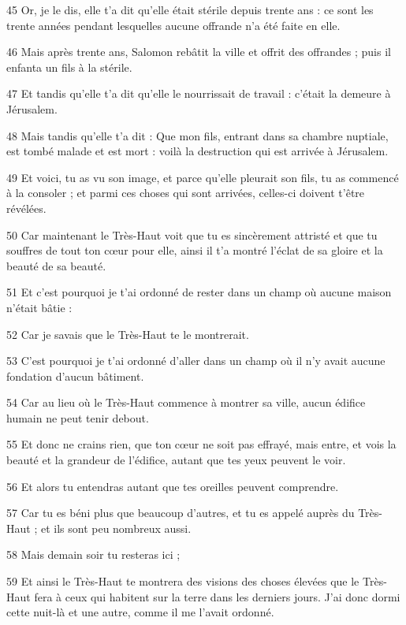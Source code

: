 \par 45 Or, je le dis, elle t'a dit qu'elle était stérile depuis trente ans : ce sont les trente années pendant lesquelles aucune offrande n'a été faite en elle.
\par 46 Mais après trente ans, Salomon rebâtit la ville et offrit des offrandes ; puis il enfanta un fils à la stérile.
\par 47 Et tandis qu'elle t'a dit qu'elle le nourrissait de travail : c'était la demeure à Jérusalem.
\par 48 Mais tandis qu'elle t'a dit : Que mon fils, entrant dans sa chambre nuptiale, est tombé malade et est mort : voilà la destruction qui est arrivée à Jérusalem.
\par 49 Et voici, tu as vu son image, et parce qu'elle pleurait son fils, tu as commencé à la consoler ; et parmi ces choses qui sont arrivées, celles-ci doivent t'être révélées.
\par 50 Car maintenant le Très-Haut voit que tu es sincèrement attristé et que tu souffres de tout ton cœur pour elle, ainsi il t'a montré l'éclat de sa gloire et la beauté de sa beauté.
\par 51 Et c'est pourquoi je t'ai ordonné de rester dans un champ où aucune maison n'était bâtie :
\par 52 Car je savais que le Très-Haut te le montrerait.
\par 53 C'est pourquoi je t'ai ordonné d'aller dans un champ où il n'y avait aucune fondation d'aucun bâtiment.
\par 54 Car au lieu où le Très-Haut commence à montrer sa ville, aucun édifice humain ne peut tenir debout.
\par 55 Et donc ne crains rien, que ton cœur ne soit pas effrayé, mais entre, et vois la beauté et la grandeur de l'édifice, autant que tes yeux peuvent le voir.
\par 56 Et alors tu entendras autant que tes oreilles peuvent comprendre.
\par 57 Car tu es béni plus que beaucoup d'autres, et tu es appelé auprès du Très-Haut ; et ils sont peu nombreux aussi.
\par 58 Mais demain soir tu resteras ici ;
\par 59 Et ainsi le Très-Haut te montrera des visions des choses élevées que le Très-Haut fera à ceux qui habitent sur la terre dans les derniers jours. J'ai donc dormi cette nuit-là et une autre, comme il me l'avait ordonné.


